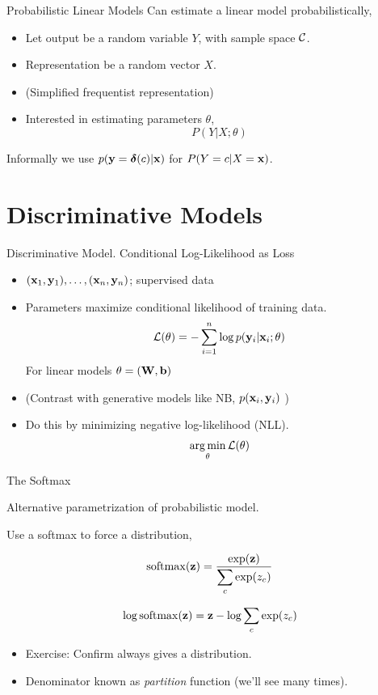 \documentclass{beamer}
\begin{document}
\begin{frame}{Probabilistic Linear Models}
  Can estimate a linear model probabilistically,

  \begin{itemize}
  \item Let output be a random variable $Y$, with sample space $\mathcal{C}$.
  \item Representation be a random vector $X$.
  \item (Simplified frequentist representation)
  \item Interested in estimating parameters $\theta$,
      \[ P(Y | X; \theta) \]
  \end{itemize}
  Informally we use $p(\mathbf{y}=\boldsymbol{\delta}(c) | \mathbf{x})$ for
  $P(Y = c | X = \mathbf{x})$.

\end{frame}

\section{Discriminative Models}

\begin{frame}{Discriminative Model. Conditional Log-Likelihood as Loss }
  \begin{itemize}
  \item $(\mathbf{x}_1, \mathbf{y}_1), \ldots, (\mathbf{x}_n, \mathbf{y}_n)$; supervised data
  \item Parameters maximize conditional likelihood of training data.
    \[ \mathcal{L}(\theta) =  - \sum_{i=1}^n \log p(\mathbf{y}_i | \mathbf{x}_i ; \theta) \]
  For linear models $\theta = (\mathbf{W}, \mathbf{b})$
   \item (Contrast with generative models like NB, $p(\mathbf{x}_i, \mathbf{y}_i)$ )
  \item Do this by minimizing negative log-likelihood (NLL).
    \[ \argmin_\theta \mathcal{L}(\theta)\]
  \end{itemize}
\end{frame}


\begin{frame}{The Softmax}

  Alternative parametrization of probabilistic model.


  Use a softmax to force a distribution,

  \[\softmax(\boldz) = \frac{\exp(\boldz)}{\displaystyle \sum_{c } \exp(z_c)}  \]

  \[\log \softmax(\boldz) = \boldz - \log \sum_{c} \exp(z_c)  \]


  \begin{itemize}
  \item Exercise: Confirm always gives a distribution.

  \item Denominator known as \textit{partition} function (we'll see many times).
  \end{itemize}

\end{frame}
\end{document}
